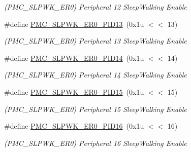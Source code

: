 \begin{DoxyCompactItemize}
\begin{DoxyCompactList}\small\item\em (P\+M\+C\+\_\+\+S\+L\+P\+W\+K\+\_\+\+E\+R0) Peripheral 12 Sleep\+Walking Enable \end{DoxyCompactList}\item 
\mbox{\label{group__SAME70__PMC_gae9789fa783a825734e8a5e5838a7163f}} 
\#define \mbox{\hyperlink{group__SAME70__PMC_gae9789fa783a825734e8a5e5838a7163f}{P\+M\+C\+\_\+\+S\+L\+P\+W\+K\+\_\+\+E\+R0\+\_\+\+P\+I\+D13}}~(0x1u $<$$<$ 13)
\begin{DoxyCompactList}\small\item\em (P\+M\+C\+\_\+\+S\+L\+P\+W\+K\+\_\+\+E\+R0) Peripheral 13 Sleep\+Walking Enable \end{DoxyCompactList}\item 
\mbox{\label{group__SAME70__PMC_ga51dadb6e66fadd3861e8928d4ae38e2a}} 
\#define \mbox{\hyperlink{group__SAME70__PMC_ga51dadb6e66fadd3861e8928d4ae38e2a}{P\+M\+C\+\_\+\+S\+L\+P\+W\+K\+\_\+\+E\+R0\+\_\+\+P\+I\+D14}}~(0x1u $<$$<$ 14)
\begin{DoxyCompactList}\small\item\em (P\+M\+C\+\_\+\+S\+L\+P\+W\+K\+\_\+\+E\+R0) Peripheral 14 Sleep\+Walking Enable \end{DoxyCompactList}\item 
\mbox{\label{group__SAME70__PMC_ga87b3b759b1c541a1812078d3fabbd40e}} 
\#define \mbox{\hyperlink{group__SAME70__PMC_ga87b3b759b1c541a1812078d3fabbd40e}{P\+M\+C\+\_\+\+S\+L\+P\+W\+K\+\_\+\+E\+R0\+\_\+\+P\+I\+D15}}~(0x1u $<$$<$ 15)
\begin{DoxyCompactList}\small\item\em (P\+M\+C\+\_\+\+S\+L\+P\+W\+K\+\_\+\+E\+R0) Peripheral 15 Sleep\+Walking Enable \end{DoxyCompactList}\item 
\mbox{\label{group__SAME70__PMC_ga13c2d732fdc323eb6082969ce7dd1787}} 
\#define \mbox{\hyperlink{group__SAME70__PMC_ga13c2d732fdc323eb6082969ce7dd1787}{P\+M\+C\+\_\+\+S\+L\+P\+W\+K\+\_\+\+E\+R0\+\_\+\+P\+I\+D16}}~(0x1u $<$$<$ 16)
\begin{DoxyCompactList}\small\item\em (P\+M\+C\+\_\+\+S\+L\+P\+W\+K\+\_\+\+E\+R0) Peripheral 16 Sleep\+Walking Enable \end{DoxyCompactList}\item 

\end{DoxyCompactItemize}
